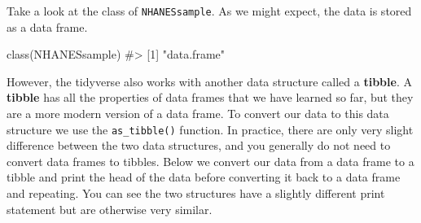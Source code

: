 \documentclass[
  letterpaper,
]{krantz}
\makeatletter
\newenvironment{Shaded}{\begin{snugshade}}{\end{snugshade}}
\newcommand{\CommentTok}[1]{\textcolor[rgb]{0.37,0.37,0.37}{#1}}
\newcommand{\FunctionTok}[1]{\textcolor[rgb]{0.28,0.35,0.67}{#1}}
\newcommand{\NormalTok}[1]{\textcolor[rgb]{0.00,0.23,0.31}{#1}}
\newenvironment{kframe}{%
\medskip{}
\setlength{\fboxsep}{.8em}
 \def\at@end@of@kframe{}%
 \ifinner\ifhmode%
  \def\at@end@of@kframe{\end{minipage}}%
  \begin{minipage}{\columnwidth}%
 \fi\fi%
 \def\FrameCommand##1{\hskip\@totalleftmargin \hskip-\fboxsep
 \colorbox{shadecolor}{##1}\hskip-\fboxsep
     \hskip-\linewidth \hskip-\@totalleftmargin \hskip\columnwidth}%
 \MakeFramed {\advance\hsize-\width
   \@totalleftmargin\z@ \linewidth\hsize
   \@setminipage}}%
 {\par\unskip\endMakeFramed%
 \at@end@of@kframe}
\renewenvironment{Shaded}{\begin{kframe}}{\end{kframe}}
\makeatother
\begin{document}
Take a look at the class of \texttt{NHANESsample}. As we might expect,
the data is stored as a data frame.

\begin{Shaded}
\begin{Highlighting}[]
\FunctionTok{class}\NormalTok{(NHANESsample)}
\CommentTok{\#\textgreater{} [1] "data.frame"}
\end{Highlighting}
\end{Shaded}

However, the tidyverse also works with another data structure called a
\textbf{tibble}. A \textbf{tibble} has all the properties of data frames
that we have learned so far, but they are a more modern version of a
data frame. To convert our data to this data structure we use the
\texttt{as\_tibble()} function. In practice, there are only very slight
difference between the two data structures, and you generally do not
need to convert data frames to tibbles. Below we convert our data from a
data frame to a tibble and print the head of the data before converting
it back to a data frame and repeating. You can see the two structures
have a slightly different print statement but are otherwise very
similar.
\end{document}
